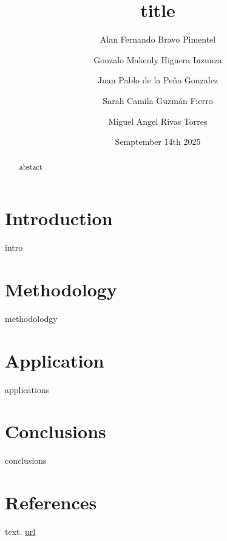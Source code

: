 \documentclass[twocolumn]{article}
\title{title}
\author{
Alan Fernando Bravo Pimentel \and
Gonzalo Makenly Higuera Inzunza \and
Juan Pablo de la Peña Gonzalez \and
Sarah Camila Guzmán Fierro \and
Miguel Angel Rivas Torres
}
\date{Semptember 14th 2025}
\begin{document}
\maketitle

\begin{abstract}
abstact
\end{abstract}

\section{Introduction}
intro


\section{Methodology}
methodolodgy



\section{Application}
applications

\section{Conclusions}
conclusions


\section{References}

\begin{thebibliography}{9}
\setlength{\itemsep}{0pt}
\setlength{\parskip}{0pt}


text. 
\url{url}

\vspace{0.3cm}


\end{thebibliography}
\end{document}
